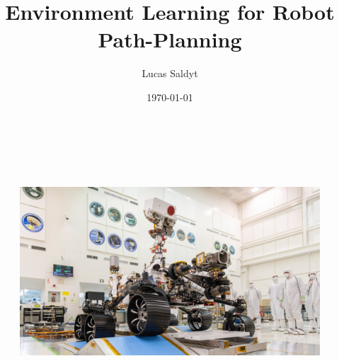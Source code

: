 \documentclass[aspectratio=169]{beamer}
\title[Environment Learning for Planning]{Environment Learning for Robot Path-Planning}
\author{Lucas Saldyt}
\institute{Arizona State University}
\date{\today}
\begin{document}
\maketitle

\begin{frame}[plain]
  \begin{figure}
  \centering
  \vspace*{-1em}
  \hspace*{-3em}
  \includegraphics[height=9.5cm,keepaspectratio]{figures/perseverance.jpg}
  \end{figure}
\end{frame}
\end{document}
